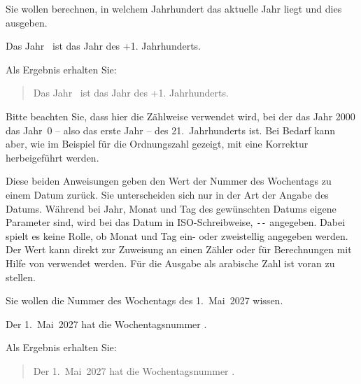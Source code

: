 \begin{Example}
  Sie wollen berechnen, in welchem Jahrhundert das aktuelle Jahr liegt und
  dies ausgeben.
\begin{lstcode}
  Das Jahr \the\year\ ist das Jahr 
  \the\DecadePart{\year} des 
  \the\numexpr \CenturyPart{\year}+1\relax. 
  Jahrhunderts.
\end{lstcode}
  Als Ergebnis erhalten Sie:
  \begin{quote}
    Das Jahr \the\year\ ist das Jahr \the\DecadePart{\year} des \the\numexpr
    \CenturyPart{\year}+1\relax.  Jahrhunderts.
  \end{quote}
\end{Example}%

Bitte beachten Sie, dass hier die Zählweise verwendet
wird, bei der das Jahr 2000 das Jahr~0 -- also das erste Jahr -- des
21.~Jahrhunderts ist. Bei Bedarf kann aber, wie im Beispiel für die
Ordnungszahl gezeigt, mit  eine Korrektur herbeigeführt
werden.%
\EndIndexGroup


\begin{Declaration}
\end{Declaration}%
Diese beiden Anweisungen geben den Wert
der Nummer des Wochentags zu einem Datum zurück. Sie
unterscheiden sich nur in der Art der Angabe des Datums. Während bei
 Jahr, Monat und Tag des gewünschten Datums eigene Parameter
sind, wird bei  das Datum in ISO-Schreibweise,
\texttt{-}\texttt{-} angegeben. Dabei
spielt es keine Rolle, ob Monat und Tag ein- oder zweistellig angegeben
werden. Der Wert kann direkt zur Zuweisung an einen Zähler oder für
Berechnungen mit Hilfe von  verwendet
werden. Für die Ausgabe als arabische Zahl ist
 voran zu stellen.

\begin{Example}
  Sie wollen die Nummer des Wochentags des 1.~Mai~2027 wissen.
\begin{lstcode}
  Der 1.~Mai~2027 hat die Wochentagsnummer 
  \the{}.
\end{lstcode}
  Als Ergebnis erhalten Sie:
  \begin{quote}
    Der 1.~Mai~2027 hat die Wochentagsnummer 
    \the{}.
  \end{quote}
\end{Example}

